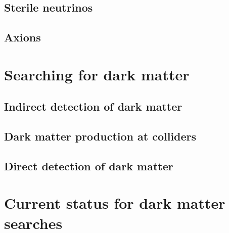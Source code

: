 \subsection{Sterile neutrinos}\label{sec:DMOverview/Neutrinos}

\subsection{Axions}\label{sec:DMOverview/Axions}

\section{Searching for dark matter}\label{sec:DMOverview/DetectionOfDM}

\subsection{Indirect detection of dark matter}\label{sec:DMOverview/IndirectDM}

\subsection{Dark matter production at colliders}\label{sec:DMOverview/DMProdColliders}

\subsection{Direct detection of dark matter}\label{sec:DMOverview/DirectDetection}

\section{Current status for dark matter searches}\label{sec:DMOverview/DMCurrentStatus}